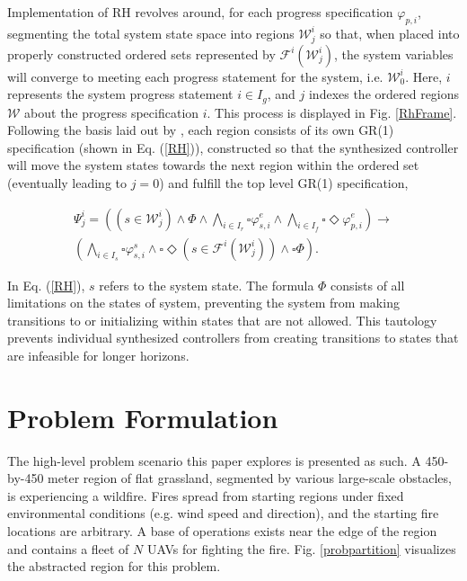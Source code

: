 \documentclass{ieeeaccess}
\newcommand{\always}{\square}
\newcommand{\eventually}{\Diamond}
\begin{document}
Implementation of RH revolves around, for each progress specification $\varphi_{p,i}$, segmenting the total system state space into regions $\mathcal{W}_j^i$ so that, when placed into properly constructed ordered sets represented by $\mathcal{F}^i(\mathcal{W}_j^i)$, the system variables will converge to meeting each progress statement for the system, i.e. $\mathcal{W}_0^i$. Here, $i$ represents the system progress statement $i \in I_g$, and $j$ indexes the ordered regions $\mathcal{W}$ about the progress specification $i$. This process is displayed in Fig. \ref{RhFrame}. Following the basis laid out by \cite{c10}, each region consists of its own GR(1) specification (shown in Eq. (\ref{RH})), constructed so that the synthesized controller will move the system states towards the next region within the ordered set (eventually leading to $j = 0$) and fulfill the top level GR(1) specification,

\begin{equation}
\label{RH}
\begin{aligned}
\Psi_{j}^{i} = ((s \in \mathcal{W}_j^i) \land \Phi \land \bigwedge_{i \in I_r} \always \varphi_{s,i}^{e} \land \bigwedge_{i \in I_f} \always \eventually \varphi_{p,i}^{e}) \longrightarrow \\
(\bigwedge_{i \in I_s} \always \varphi_{s,i}^{s} \land \always \eventually(s \in \mathcal{F}^i(\mathcal{W}_j^i)) \land \always \Phi).
\end{aligned}
\end{equation}

In Eq. (\ref{RH}), $s$ refers to the system state. The formula $\Phi$ consists of all limitations on the states of system, preventing the system from making transitions to or initializing within states that are not allowed. This tautology prevents individual synthesized controllers from creating transitions to states that are infeasible for longer horizons.

\section{Problem Formulation}
The high-level problem scenario this paper explores is presented as such. A 450-by-450 meter region of flat grassland, segmented by various large-scale obstacles, is experiencing a wildfire. Fires spread from starting regions under fixed environmental conditions (e.g. wind speed and direction), and the starting fire locations are arbitrary. A base of operations exists near the edge of the region and contains a fleet of $N$ UAVs for fighting the fire. Fig. \ref{probpartition} visualizes the abstracted region for this problem. 
\end{document}
